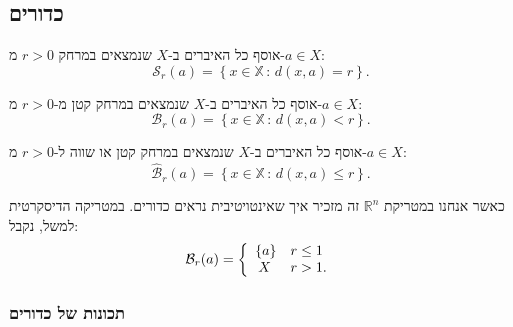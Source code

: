 \documentclass{tstextbook}
\begin{document}
\subsection{כדורים}

\begin{definition}[ספרה]
אוסף כל האיברים ב-\(X\) שנמצאים במרחק \(r>0\) מ-\(a\in X\):
$${\mathcal{S}}_{r}(a)=\left\{x\in\mathbb{X}\,:\,d(x,a)=r\right\}.$$

\end{definition}
\begin{definition}
אוסף כל האיברים ב-\(X\) שנמצאים במרחק קטן מ-\(r>0\) מ-\(a\in X\):
$${\mathcal{B}}_{r}(a)=\left\{x\in\mathbb{X}\,:\,d(x,a)<r\right\}.$$

\end{definition}
\begin{definition}
אוסף כל האיברים ב-\(X\) שנמצאים במרחק קטן או שווה ל-\(r>0\) מ-\(a\in X\):
$${\hat{\mathcal{B}}}_{r}(a)=\left\{x\in\mathbb{X}\,:\,d(x,a)\leq r\right\}.$$

\end{definition}
כאשר אנחנו במטריקת \(\mathbb{R}^n\) זה מזכיר איך שאינטויטיבית נראים כדורים. במטריקה הדיסקרטית למשל, נקבל:
$$\mathcal{B}_{r}(a)=\left\{\begin{array}{l l}{{\{a\}}}&{{r\leq1}}\\ {\:{X}}&{{r>1.}}\end{array}\right.$$

\subsubsection{תכונות של כדורים}
\end{document}
